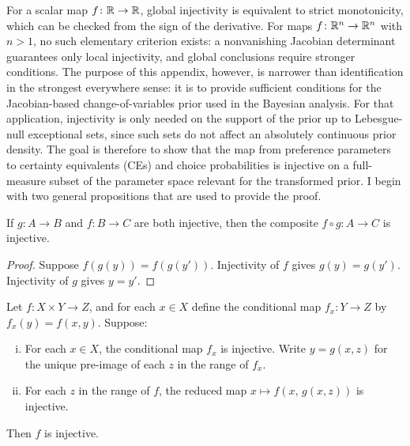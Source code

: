 \label{app:global_injectivity}

For a scalar map $f \colon \mathbb{R} \to \mathbb{R}$, global injectivity is equivalent to
strict monotonicity, which can be checked from the sign of the derivative. For
maps $f \colon \mathbb{R}^n \to \mathbb{R}^n$ with $n > 1$, no such elementary criterion
exists: a nonvanishing Jacobian determinant guarantees only local injectivity,
and global conclusions require stronger conditions. The purpose of this
appendix, however, is narrower than identification in the strongest everywhere
sense: it is to provide sufficient conditions for the Jacobian-based
change-of-variables prior used in the Bayesian analysis. For that application,
injectivity is only needed on the support of the prior up to Lebesgue-null
exceptional sets, since such sets do not affect an absolutely continuous prior
density. The goal is therefore to show that the map from preference parameters
to certainty equivalents (CEs) and choice probabilities is injective on a
full-measure subset of the parameter space relevant for the transformed prior.
I begin with two general propositions that are used to provide the proof.

\begin{proposition}[Composition]
\label{prop:composition}
If $g \colon A \to B$ and $f \colon B \to C$ are both injective,
then the composite $f \circ g \colon A \to C$ is injective.
\end{proposition}

\begin{proof}
Suppose $f(g(y)) = f(g(y'))$. Injectivity of $f$ gives
$g(y) = g(y')$. Injectivity of $g$ gives $y = y'$.
\end{proof}

\begin{proposition}
\label{prop:sequential}
Let $f \colon X \times Y \to Z$, and for each $x \in X$ define the
conditional map $f_x \colon Y \to Z$ by $f_x(y) = f(x,y)$. Suppose:
\begin{enumerate}[(i)]
    \item For each $x \in X$, the conditional map $f_x$ is injective.
    Write $y = g(x,z)$ for the unique pre-image of each $z$ in the
    range of $f_x$.
    \item For each $z$ in the range of $f$, the reduced map
    $x \mapsto f(x,\, g(x,z))$ is injective.
\end{enumerate}
Then $f$ is injective.
\end{proposition}

